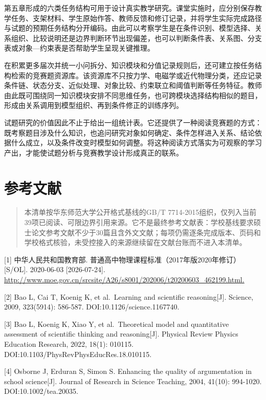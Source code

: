 \documentclass[
  12pt,
  a4paper]{ctexbook}
\begin{document}
第五章形成的六类任务结构可用于设计真实教学研究。课堂实施时，应分别保存教学任务、支架材料、学生原始作答、教师反馈和修订记录，并将学生实际完成路径与试题的预期任务结构分开编码。由此可以考察学生是在条件识别、模型选择、关系组织、比较说明还是边界判断环节出现偏差，也可以判断条件表、关系图、分支表或对象---约束表是否帮助学生呈现关键推理。

在积累更多届次并统一小问拆分、知识模块和分值记录规则后，还可建立按任务结构检索的竞赛题资源库。该资源库不只按力学、电磁学或近代物理分类，还应记录条件链、状态分支、近似处理、对象比较、约束联立和阈值判断等任务特征。教师由此既可围绕同一知识模块安排不同思维任务，也可跨模块选择结构相似的题目，形成由关系调用到模型组织、再到条件修正的训练序列。

试题研究的价值因此不止于给出一组统计表。它还提供了一种阅读竞赛题的方式：既考察题目涉及什么知识，也追问研究对象如何确定、条件怎样进入关系、结论依据什么成立，以及条件改变时模型如何调整。将这种阅读方式落实为可观察的学习产出，才能使试题分析与竞赛教学设计形成真正的联系。

\chapter*{参考文献}\label{ux53c2ux8003ux6587ux732e}

\begin{quote}
本清单按华东师范大学公开格式基线的GB/T
7714-2015组织，仅列入当前39项已阅读、可限边界引用来源。它不是最终参考文献表：学校基线要求硕士论文参考文献不少于30篇且含外文文献；每项仍需逐条完成版本、页码和学校格式核验，未受控接入的来源继续留在文献台账而不进入本清单。
\end{quote}

{[}1{]} 中华人民共和国教育部.
普通高中物理课程标准（2017年版2020年修订）{[}S/OL{]}. 2020-06-03
{[}2026-07-24{]}.
\url{http://www.moe.gov.cn/srcsite/A26/s8001/202006/t20200603_462199.html.}

{[}2{]} Bao L, Cai T, Koenig K, et al.~Learning and scientific
reasoning{[}J{]}. Science, 2009, 323(5914): 586-587.
DOI:10.1126/science.1167740.

{[}3{]} Bao L, Koenig K, Xiao Y, et al.~Theoretical model and
quantitative assessment of scientific thinking and reasoning{[}J{]}.
Physical Review Physics Education Research, 2022, 18(1): 010115.
DOI:10.1103/PhysRevPhysEducRes.18.010115.

{[}4{]} Osborne J, Erduran S, Simon S. Enhancing the quality of
argumentation in school science{[}J{]}. Journal of Research in Science
Teaching, 2004, 41(10): 994-1020. DOI:10.1002/tea.20035.
\end{document}
